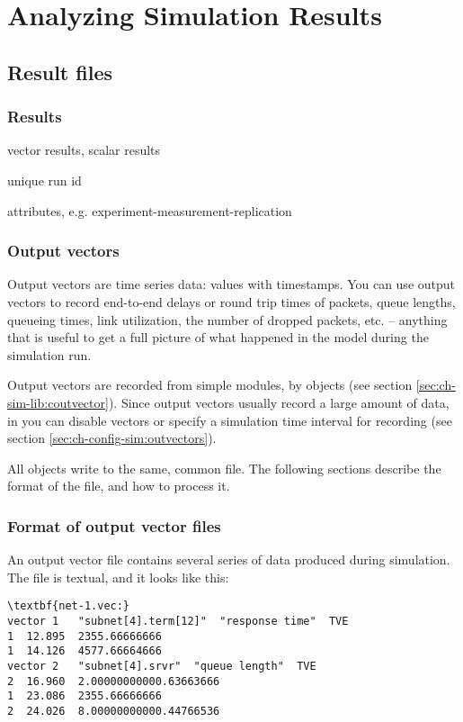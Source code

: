 \chapter{Analyzing Simulation Results}
\label{cha:analyzing-simulation-results}


\section{Result files}

\subsection{Results}

vector results, scalar results

unique run id

attributes, e.g. experiment-measurement-replication


\subsection{Output vectors}
\label{sec:ch-ana-sim:output-vectors}

Output vectors are time series data: values with timestamps.
You can use output vectors to record end-to-end delays or
round trip times of packets, queue lengths, queueing times,
link utilization, the number of dropped packets, etc. --
anything that is useful to get a full picture of what happened
in the model during the simulation run.

Output vectors are recorded from simple modules, by  objects
(see section \ref{sec:ch-sim-lib:coutvector}). Since output vectors usually
record a large amount of data, in  you can disable vectors
or specify a simulation time interval for recording
(see section \ref{sec:ch-config-sim:outvectors}).

All  objects write to the same, common file.
The following sections describe the format of the file, and
how to process it.


\subsection{Format of output vector files}

An output vector file contains several
series of data produced during simulation. The file is textual, and it
looks like this:

\begin{Verbatim}[commandchars=\\\{\}]
\textbf{net-1.vec:}
vector 1   "subnet[4].term[12]"  "response time"  TVE
1  12.895  2355.66666666
1  14.126  4577.66664666
vector 2   "subnet[4].srvr"  "queue length"  TVE
2  16.960  2.00000000000.63663666
1  23.086  2355.66666666
2  24.026  8.00000000000.44766536
\end{Verbatim}

